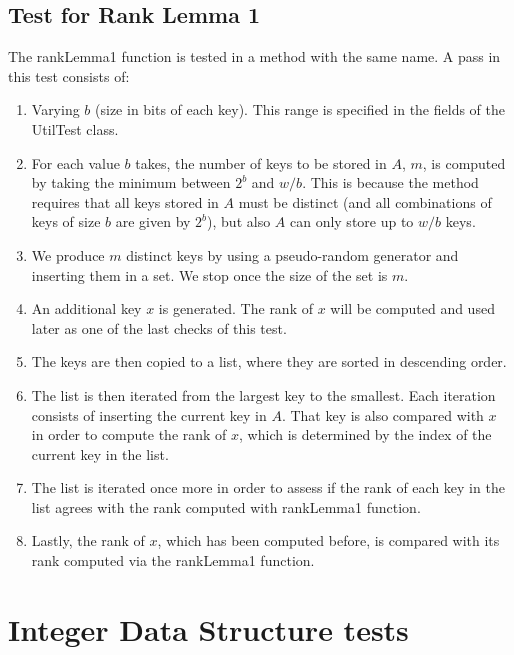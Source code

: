 \subsection{Test for Rank Lemma 1}
The {\ttfamily rankLemma1} function is tested in a method with the same name.
A pass in this test consists of:
\begin{enumerate}
    \item
    Varying $b$ (size in bits of each key). This range is specified in the fields of the {\ttfamily UtilTest} class.
    
    \item
    For each value $b$ takes, the number of keys to be stored in $A$, $m$, is computed by taking the minimum between $2^b$ and $w/b$. This is because the method requires that all keys stored in $A$ must be distinct (and all combinations of keys of size $b$ are given by $2^b$), but also $A$ can only store up to $w/b$ keys.
    
    \item
    We produce $m$ distinct keys by using a pseudo-random generator and inserting them in a set. We stop once the size of the set is $m$.
    
    \item
    An additional key $x$ is generated. The rank of $x$ will be computed and used later as one of the last checks of this test.
    
    \item
    The keys are then copied to a list, where they are sorted in descending order.
    
    \item
    The list is then iterated from the largest key to the smallest. Each iteration consists of inserting the current key in $A$. That key is also compared with $x$ in order to compute the rank of $x$, which is determined by the index of the current key in the list.
    
    \item
    The list is iterated once more in order to assess if the rank of each key in the list agrees with the rank computed with {\ttfamily rankLemma1} function.
    
    \item
    Lastly, the rank of $x$, which has been computed before, is compared with its rank computed via the {\ttfamily rankLemma1} function.
\end{enumerate}

\section{Integer Data Structure tests} \label{sec:IntegerDataStructureTests}

